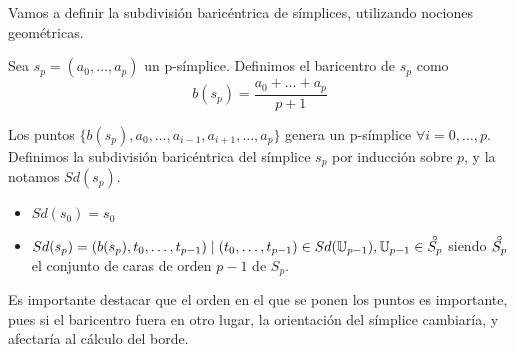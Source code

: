 Vamos a definir la subdivisión baricéntrica de símplices, utilizando nociones geométricas.

\begin{definition}
  Sea $s_p = (a_0, \dots, a_p)$ un p-símplice. Definimos el baricentro de $s_p$ como
  \[b(s_p) = \frac{a_0 + \dots + a_p}{p+1}\]
\end{definition}

Los puntos $\{b(s_p), a_0, \dots, a_{i-1}, a_{i+1}, \dots, a_p\}$ genera un p-símplice $\forall i = 0, \dots, p$.
Definimos la subdivisión baricéntrica del símplice $s_p$ por inducción sobre $p$, y la notamos $Sd(s_p)$.
\begin{itemize}
  \item $Sd(s_0) = s_0$
  \item $Sd(s_p) = (b(s_p), t_0, \dots, t_{p-1}) \mid (t_0, \dots, t_{p-1}) \in Sd(\U_{p-1}), \U_{p-1} \in \interior{S_p}$
        siendo $\interior{S_p}$ el conjunto de caras de orden $p-1$ de $S_p$.
\end{itemize}

\begin{remark}
  Es importante destacar que el orden en el que se ponen los puntos es importante, pues si el baricentro fuera en otro lugar,
  la orientación del símplice cambiaría, y afectaría al cálculo del borde.
\end{remark}

